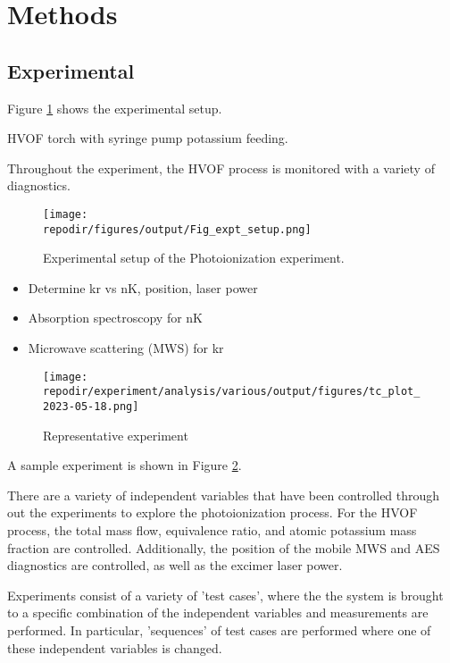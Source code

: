 \section{Methods}


\subsection{Experimental}

Figure \ref{fig:expt_setup} shows the experimental setup. 

HVOF torch with syringe pump potassium feeding. 

Throughout the experiment, the HVOF process is monitored with a variety of diagnostics. 


\begin{figure}[h]
    \texttt{[image: \\repodir/figures/output/Fig\_expt\_setup.png]} 
    \caption{Experimental setup of the Photoionization experiment. }
    \label{fig:expt_setup}
\end{figure}

\begin{itemize}
\item Determine kr vs nK, position, laser power
\item Absorption spectroscopy for nK
\item Microwave scattering (MWS) for kr 
\end{itemize}


\begin{figure}[p]
    \texttt{[image: \\repodir/experiment/analysis/various/output/figures/tc\_plot\_2023-05-18.png]} 
    \caption{Representative experiment}
    \label{fig:expt_example}
\end{figure}

A sample experiment is shown in Figure \ref{fig:expt_example}.

There are a variety of independent variables that have been controlled through out the experiments to explore the photoionization process. For the HVOF process, the total mass flow, equivalence ratio, and atomic potassium mass fraction are controlled. Additionally, the position of the mobile MWS and AES diagnostics are controlled, as well as the excimer laser power. 

Experiments consist of a variety of 'test cases', where the the system is brought to a specific combination of the independent variables and measurements are performed. In particular, 'sequences' of test cases are performed where one of these independent variables is changed. 

